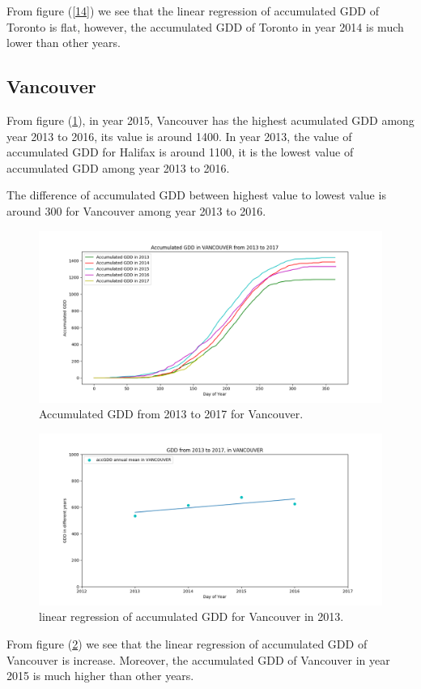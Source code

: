 \documentclass[12pt]{article}
\begin{document}
From figure (\ref{14}) we see that the linear regression of accumulated GDD of Toronto is flat, however, the accumulated GDD of Toronto in year 2014 is much lower than other years.
\subsection{Vancouver}


From figure (\ref{15}), in year 2015, Vancouver has the highest acumulated GDD among year 2013 to 2016, its value is around 1400. In year 2013, the value of accumulated GDD for Halifax is around 1100, it is the lowest value of accumulated GDD among year 2013 to 2016. 

The difference of accumulated GDD between highest value to lowest value is around 300 for Vancouver among year 2013 to 2016.
\begin{center}
\begin{figure}[H]
\includegraphics[width=5.25in]{../Plot/VANCOUVER/accGDD_2013_2017.png}

\caption{Accumulated GDD from 2013 to 2017 for Vancouver.}
\label{15}
\end{figure}
\end{center}

\begin{center}
\begin{figure}[H]
\includegraphics[width=5.25in]{../Plot/VANCOUVER/GDD_LinearRegression_VANCOUVER.png}
\caption{linear regression of accumulated GDD for Vancouver in 2013.}
\label{16}
\end{figure}
\end{center}
From figure (\ref{16}) we see that the linear regression of accumulated GDD of Vancouver is increase. Moreover, the accumulated GDD of Vancouver in year 2015 is much higher than other years.
\end{document}
